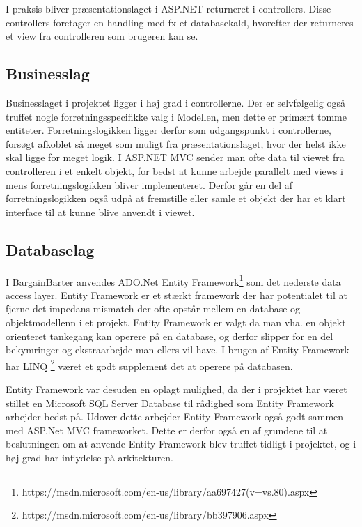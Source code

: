 I  praksis bliver  præsentationslaget i ASP.NET returneret i controllers. Disse controllers foretager en handling med fx et databasekald, hvorefter der returneres et view fra controlleren som brugeren kan se.
\subsection{Businesslag}
Businesslaget i projektet ligger i høj grad i controllerne. Der er selvfølgelig også truffet nogle forretningsspecifikke valg i Modellen, men dette er primært tomme entiteter. Forretningslogikken ligger derfor som udgangspunkt i controllerne, forsøgt afkoblet så meget som muligt fra præsentationslaget, hvor der helst ikke skal ligge for meget logik. I ASP.NET MVC sender man ofte data til viewet fra controlleren i et enkelt objekt, for bedst at kunne arbejde parallelt med views i mens forretningslogikken bliver implementeret. Derfor går en del af forretningslogikken også udpå at fremstille eller samle et objekt der har et klart interface til at kunne blive anvendt i viewet. 

\subsection{Databaselag}
I BargainBarter anvendes ADO.Net Entity Framework\footnote{https://msdn.microsoft.com/en-us/library/aa697427(v=vs.80).aspx} som det nederste data access layer. Entity Framework er et stærkt framework der har potentialet til at fjerne det impedans mismatch der ofte opstår mellem en database og objektmodellenn i et projekt. Entity Framework er valgt da man vha. en objekt orienteret tankegang kan operere på en database, og derfor slipper for en del bekymringer og ekstraarbejde man ellers vil have. I brugen af Entity Framework har LINQ \footnote{https://msdn.microsoft.com/en-us/library/bb397906.aspx} været et godt supplement det at operere på databasen. 

Entity Framework var desuden en oplagt mulighed, da der i projektet har været stillet en Microsoft SQL Server Database til rådighed som Entity Framework arbejder bedst på. Udover dette arbejder Entity Framework også godt sammen med ASP.Net MVC frameworket. Dette er derfor også en af grundene til at beslutningen om at anvende Entity Framework blev truffet tidligt i projektet, og i høj grad har inflydelse på arkitekturen. 

